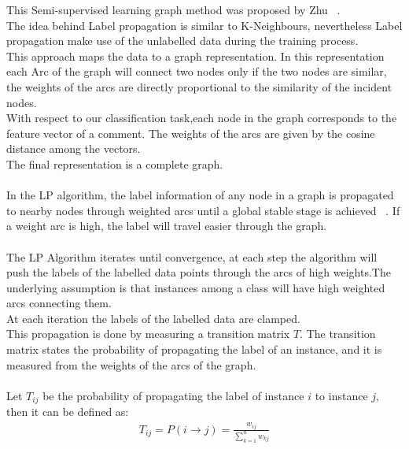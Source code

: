 \documentclass[4pt,a4paper,twocolumn]{article}
\begin{document}
This Semi-supervised learning graph method was proposed by Zhu ~\cite{Zhu:2005:SLG:1104523}.\\
The idea behind Label propagation is similar to K-Neighbours, nevertheless Label propagation make use of the unlabelled data during the training process.\\

This approach maps the data to a graph representation.
In this representation each Arc of the graph will connect two nodes only if the two nodes are similar,
the weights of the arcs are directly proportional to the similarity of the incident nodes.\\

With respect to our classification task,each node in the graph corresponds to the feature vector of a comment.
The weights of the arcs are given by the cosine distance among the vectors.\\
The final representation is a complete graph.\\
\\
In the LP algorithm, the label information of any
node in a graph is propagated to nearby nodes
through weighted arcs until a global stable stage is
achieved ~\cite{Chen:2006:REU:1220175.1220192}.
If a weight arc is high, the label will travel easier through the graph.\\
\\
The LP Algorithm iterates until convergence,
at each step the algorithm will push the labels
of the labelled data points through the arcs of high weights.The underlying assumption is that instances among a class will have high weighted arcs
connecting them.\\
At each iteration the labels of the labelled data are clamped.\\

This propagation is done by measuring a transition matrix $T$.
The transition matrix states the probability of propagating the label of an instance,
and it is measured from the weights of the arcs of the graph.\\
\\
Let $T_{ij}$ be the probability of propagating the label of instance $i$ to instance $j$, then it can be defined as:\\
\begin{align}
	T_{ij}=P(i \rightarrow j)=\frac{w_{ij}}{\sum_{k=1}^{n} w_{kj}}
\end{align}
\end{document}
